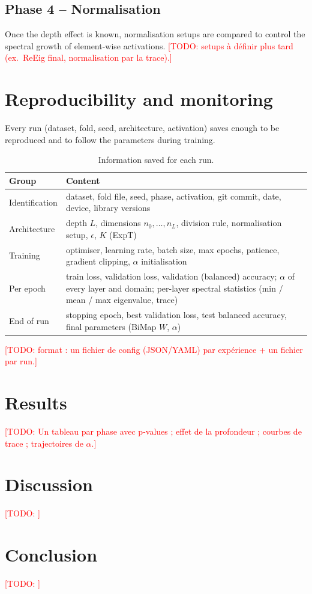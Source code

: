 \documentclass[11pt,a4paper]{article}
\newcommand{\todo}[1]{\textcolor{red}{[TODO: #1]}}
\begin{document}
\subsection{Phase 4 -- Normalisation}
\label{sec:phase4}
Once the depth effect is known, normalisation setups are compared to control the spectral
growth of element-wise activations.
\todo{setups à définir plus tard (ex.\ ReEig final, normalisation par la trace).}

\section{Reproducibility and monitoring}
\label{sec:repro}

Every run (dataset, fold, seed, architecture, activation) saves enough to be reproduced and
to follow the parameters during training.

\begin{table}[h]
\centering
\caption{Information saved for each run.}
\label{tab:logging}
\small
\begin{tabular}{lp{11cm}}
\toprule
Group & Content \\
\midrule
Identification & dataset, fold file, seed, phase, activation, git commit, date, device, library versions \\
Architecture   & depth $L$, dimensions $n_0,\dots,n_L$, division rule, normalisation setup, $\epsilon$, $K$ (ExpT) \\
Training       & optimiser, learning rate, batch size, max epochs, patience, gradient clipping,
                 $\alpha$ initialisation \\
Per epoch      & train loss, validation loss, validation (balanced) accuracy;
                 $\alpha$ of every layer and domain;
                 per-layer spectral statistics (min / mean / max eigenvalue, trace) \\
End of run     & stopping epoch, best validation loss, test balanced accuracy,
                 final parameters (BiMap $W$, $\alpha$) \\
\bottomrule
\end{tabular}
\end{table}

\todo{format : un fichier de config (JSON/YAML) par expérience + un fichier par run.}

\section{Results}
\todo{Un tableau par phase avec p-values ; effet de la profondeur ; courbes de trace ;
trajectoires de $\alpha$.}

\section{Discussion}
\todo{}

\section{Conclusion}
\todo{}
\end{document}
